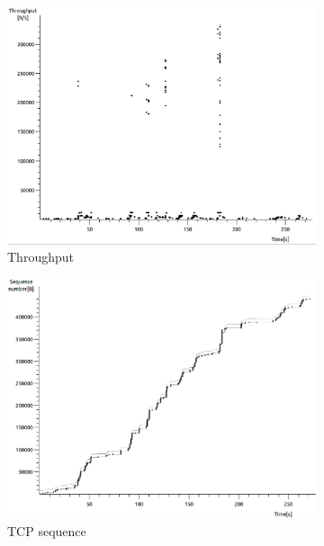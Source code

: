 \documentclass[conference,a4paper]{../../sty/IEEEtran}
\begin{document}
\begin{figure}
 \centering
 \begin{subfigure}[b]{0.2\textwidth}
  \includegraphics[width=\textwidth]{s5-1_th}
  \caption{Throughput}
 \end{subfigure}
 \begin{subfigure}[b]{0.2\textwidth}
  \includegraphics[width=\textwidth]{s5-1_seq}
  \caption{TCP sequence}
 \end{subfigure}
 \begin{subfigure}[b]{0.2\textwidth}

\end{subfigure}
\end{figure}
\end{document}
